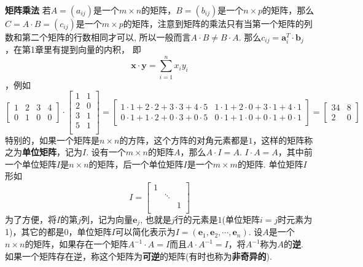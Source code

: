 \paragraph{}
\textbf{矩阵乘法} \: 若$A = (a_{ij})$是一个$m\times n$的矩阵，$B = (b_{ij})$是一个$n\times p$的矩阵，那么$C = A \cdot B = (c_{ij})$是一个$m\times p$的矩阵，注意到矩阵的乘法只有当第一个矩阵的列数和第二个矩阵的行数相同才可以, 所以一般而言$A\cdot B \neq B \cdot A$.  那么$c_{ij} = \textbf{a}_i^T \cdot \textbf{b}_j$ ，在第1章里有提到向量的内积， 即
$$
\textbf{x} \cdot \textbf{y} = \sum_{i = 1}^n x_i y_i
$$，例如
$$
\begin{bmatrix}
    1 & 2 & 3 & 4 \\
    0 & 1 & 0 & 0 
  \end{bmatrix}  \cdot 
  \begin{bmatrix}
    1 & 1 \\
    2 & 0 \\ 
    3 & 1 \\
    5 & 1 \\
  \end{bmatrix} = 
  \begin{bmatrix}
    1 \cdot 1 + 2 \cdot 2 + 3 \cdot 3 + 4 \cdot 5 & 1 \cdot 1 + 2 \cdot 0 + 3 \cdot 1 + 4 \cdot 1 \\
    0 \cdot 1 + 1 \cdot 2 + 0 \cdot 3 + 0 \cdot 5 & 0 \cdot 1 + 1 \cdot 0 + 0 \cdot 1 + 0 \cdot 1
  \end{bmatrix} = 
  \begin{bmatrix}
    34 & 8 \\
    2 & 0
  \end{bmatrix}
$$
特别的，如果一个矩阵是$n\times n$的方阵，这个方阵的对角元素都是$1$，这样的矩阵称之为\textbf{单位矩阵}，记为$I$. 设有一个$m\times n$的矩阵$A$，那么$A\cdot I = A$. $I \cdot A = A$，其中前一个单位矩阵$I$是$n\times n$的矩阵，后一个单位矩阵$I$是一个$m\times m$的矩阵. 单位矩阵$I$形如
$$
I = \begin{bmatrix}
    1 & &  \\
       & \ddots & \\ 
       & & 1 \\
  \end{bmatrix}
$$
为了方便，将$I$的第$j$列，记为向量$\textbf{e}_j$, 也就是$j$行的元素是$1$(单位矩阵$i=j$时元素为1)，其它的都是$0$，单位矩阵$I$可以简化表示为$I = (\textbf{e}_1, \textbf{e}_2, \cdots, \textbf{e}_n)$.
\newline
设$A$是一个$n\times n$的矩阵，如果存在一个矩阵$A^{-1} \cdot A = I$而且$A\cdot A^{-1} = I$，将$A^{-1}$称为$A$的\textbf{逆}. 如果一个矩阵存在逆，称这个矩阵为\textbf{可逆}的矩阵(有时也称为\textbf{非奇异的}).

